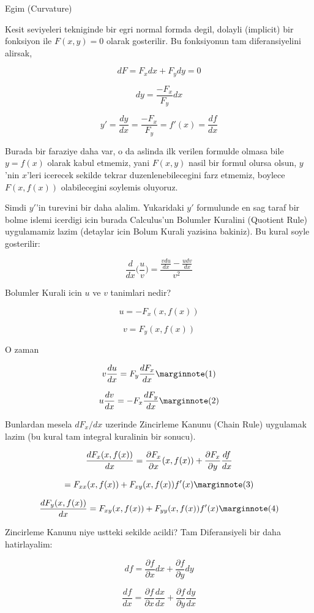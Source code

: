 \documentclass[12pt,fleqn]{article}\usepackage{../common}
\begin{document}
Egim (Curvature)

Kesit seviyeleri tekniginde bir egri normal formda degil, dolayli (implicit) bir
fonksiyon ile $F(x,y) = 0$ olarak gosterilir. Bu fonksiyonun tam diferansiyelini
alirsak,

\[ dF = F_x dx + F_y dy = 0  \]

\[ dy = \frac{-F_x}{F_y}dx  \]

\[ y' = \frac{dy}{dx} = \frac{-F_x}{F_y} = f'(x) = \frac{df}{dx} \]

Burada bir faraziye daha var, o da aslinda ilk verilen formulde olmasa bile
$y=f(x)$ olarak kabul etmemiz, yani $F(x,y)$ nasil bir formul olursa olsun,
$y$'nin $x$'leri icerecek sekilde tekrar duzenlenebilecegini farz etmemiz,
boylece $F(x,f(x))$ olabilecegini soylemis oluyoruz.

Simdi $y'$'in turevini bir daha alalim. Yukaridaki $y'$ formulunde en sag
taraf bir bolme islemi icerdigi icin burada Calculus'un Bolumler Kuralini
(Quotient Rule) uygulamamiz lazim (detaylar icin Bolum Kurali yazisina
bakiniz). Bu kural soyle gosterilir:

\[ \frac{d}{dx}\bigg(\frac{u}{v}\bigg) = 
\frac{\displaystyle \frac{v du}{dx} - \frac{u dv}{dx}}{v^2} \]

Bolumler Kurali icin $u$ ve $v$ tanimlari nedir? 

\[ u = -F_x(x,f(x))  \]

\[ v = F_y(x,f(x)) \]

O zaman

\[ 
v \frac{du}{dx} = F_y \frac{dF_x}{dx} 
\mlabel{1}
\]

\[
u \frac{dv}{dx} = -F_x \frac{dF_y }{dx} 
\mlabel{2}
\]

Bunlardan mesela $dF_x/dx$ uzerinde Zincirleme Kanunu (Chain Rule) uygulamak
lazim (bu kural tam integral kuralinin bir sonucu). 

\[ \frac{d F_x(x,f(x)) }{dx} = \frac{\partial F_x}{\partial  x}(x,f(x))+\frac{\partial F_x}{\partial y}\frac{df}{dx}\\ \]

\[
= F_{xx}(x,f(x))+F_{xy}(x,f(x))f'(x) 
\mlabel{3}
\]

\[
\frac{d F_y(x,f(x)) }{dx} =  F_{xy}(x,f(x))+F_{yy}(x,f(x))f'(x) 
\mlabel{4}
\]

Zincirleme Kanunu niye ustteki sekilde acildi? Tam Diferansiyeli bir daha
hatirlayalim:

\[ df = \frac{\partial f}{\partial x} dx + \frac{\partial f}{\partial y} dy  \]

\[ \frac{df}{dx} = \frac{\partial f}{\partial x} \frac{dx}{dx} + \frac{\partial f}{\partial y} \frac{dy}{dx}  \]
\end{document}
